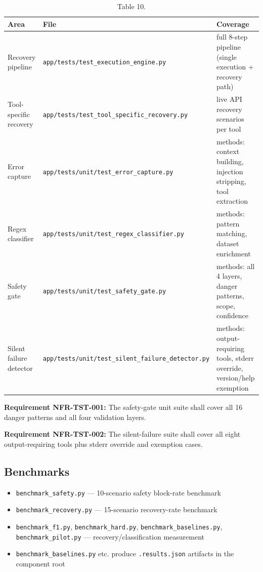 \documentclass[10pt,journal,onecolumn]{IEEEtran}
\newcommand{\reqid}[1]{\textbf{#1}}
\begin{document}
\begin{table}[h]
\caption{Table 10.}
\label{tab:t10}
\begin{tabularx}{\columnwidth}{l >{\raggedright\arraybackslash}X >{\raggedright\arraybackslash}X}
\toprule
\textbf{Area} & \textbf{File} & \textbf{Coverage}\\
\midrule
Recovery pipeline & \texttt{app/\allowbreak tests/\allowbreak test\_\allowbreak execution\_\allowbreak engine.\allowbreak py} & full 8-step pipeline (single execution + recovery path)\\
Tool-specific recovery & \texttt{app/\allowbreak tests/\allowbreak test\_\allowbreak tool\_\allowbreak specific\_\allowbreak recovery.\allowbreak py} & live API recovery scenarios per tool\\
Error capture & \texttt{app/\allowbreak tests/\allowbreak unit/\allowbreak test\_\allowbreak error\_\allowbreak capture.\allowbreak py} & 20 methods: context building, injection stripping, tool extraction\\
Regex classifier & \texttt{app/\allowbreak tests/\allowbreak unit/\allowbreak test\_\allowbreak regex\_\allowbreak classifier.\allowbreak py} & 14 methods: pattern matching, dataset enrichment\\
Safety gate & \texttt{app/\allowbreak tests/\allowbreak unit/\allowbreak test\_\allowbreak safety\_\allowbreak gate.\allowbreak py} & 34 methods: all 4 layers, danger patterns, scope, confidence\\
Silent failure detector & \texttt{app/\allowbreak tests/\allowbreak unit/\allowbreak test\_\allowbreak silent\_\allowbreak failure\_\allowbreak detector.\allowbreak py} & 14 methods: output-requiring tools, stderr override, version/help exemption\\
\bottomrule
\end{tabularx}
\end{table}

\reqid{Requirement NFR-TST-001:} The safety-gate unit suite shall cover all 16 danger patterns and all four validation layers.

\reqid{Requirement NFR-TST-002:} The silent-failure suite shall cover all eight output-requiring tools plus stderr override and exemption cases.

\subsection{Benchmarks}

\begin{itemize}
\item \texttt{benchmark\_safety.py} --- 10-scenario safety block-rate benchmark
\item \texttt{benchmark\_recovery.py} --- 15-scenario recovery-rate benchmark
\item \texttt{benchmark\_f1.py}, \texttt{benchmark\_hard.py}, \texttt{benchmark\_baselines.py}, \texttt{benchmark\_pilot.py} --- recovery/classification measurement
\item \texttt{benchmark\_baselines.py} etc. produce \texttt{.results.json} artifacts in the component root
\end{itemize}
\end{document}
